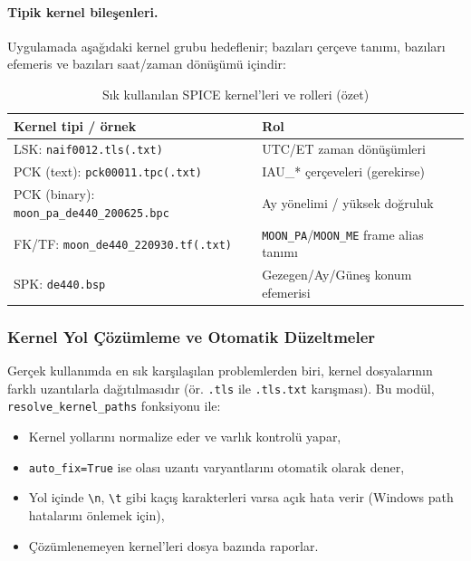 \paragraph{Tipik kernel bileşenleri.}
Uygulamada aşağıdaki kernel grubu hedeflenir;
bazıları çerçeve tanımı, bazıları efemeris ve bazıları saat/zaman dönüşümü içindir:

\begin{table}[H]
\centering
\caption{Sık kullanılan SPICE kernel’leri ve rolleri (özet)}
\label{tab:spice_kernels}
\begin{tabular}{ll}
\toprule
Kernel tipi / örnek & Rol \\
\midrule
LSK: \texttt{naif0012.tls(.txt)} & UTC/ET zaman dönüşümleri \\
PCK (text): \texttt{pck00011.tpc(.txt)} & IAU\_* çerçeveleri (gerekirse) \\
PCK (binary): \texttt{moon\_pa\_de440\_200625.bpc} & Ay yönelimi / yüksek doğruluk \\
FK/TF: \texttt{moon\_de440\_220930.tf(.txt)} & \texttt{MOON\_PA}/\texttt{MOON\_ME} frame alias tanımı \\
SPK: \texttt{de440.bsp} & Gezegen/Ay/Güneş konum efemerisi \\
\bottomrule
\end{tabular}
\end{table}

\subsubsection{Kernel Yol Çözümleme ve Otomatik Düzeltmeler}

Gerçek kullanımda en sık karşılaşılan problemlerden biri,
kernel dosyalarının farklı uzantılarla dağıtılmasıdır
(ör. \texttt{.tls} ile \texttt{.tls.txt} karışması).
Bu modül, \texttt{resolve\_kernel\_paths} fonksiyonu ile:

\begin{itemize}
  \item Kernel yollarını normalize eder ve varlık kontrolü yapar,
  \item \texttt{auto\_fix=True} ise olası uzantı varyantlarını otomatik olarak dener,
  \item Yol içinde \texttt{\textbackslash n}, \texttt{\textbackslash t} gibi kaçış karakterleri varsa
        açık hata verir (Windows path hatalarını önlemek için),
  \item Çözümlenemeyen kernel’leri dosya bazında raporlar.
\end{itemize}

